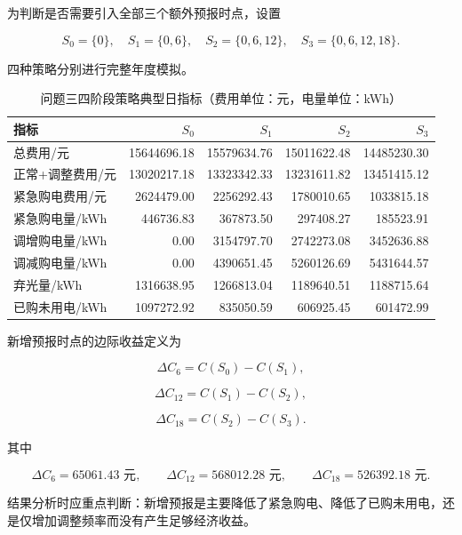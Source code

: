 为判断是否需要引入全部三个额外预报时点，设置

\[
S_0=\{0\},
\quad
S_1=\{0,6\},
\quad
S_2=\{0,6,12\},
\quad
S_3=\{0,6,12,18\}.
\]

四种策略分别进行完整年度模拟。

\begin{table}[H]
\centering
{}
\begin{tabular}{lrrrr}
\toprule
指标 & \(S_0\) & \(S_1\) & \(S_2\) & \(S_3\) \\
\midrule
总费用/元 & 15644696.18 & 15579634.76 & 15011622.48 & 14485230.30 \\
正常+调整费用/元 & 13020217.18 & 13323342.33 & 13231611.82 & 13451415.12 \\
紧急购电费用/元 & 2624479.00 & 2256292.43 & 1780010.65 & 1033815.18 \\
紧急购电量/kWh & 446736.83 & 367873.50 & 297408.27 & 185523.91 \\
调增购电量/kWh & 0.00 & 3154797.70 & 2742273.08 & 3452636.88 \\
调减购电量/kWh & 0.00 & 4390651.45 & 5260126.69 & 5431644.57 \\
弃光量/kWh & 1316638.95 & 1266813.04 & 1189640.51 & 1188715.64 \\
已购未用电/kWh & 1097272.92 & 835050.59 & 606925.45 & 601472.99 \\
\bottomrule
\end{tabular}
\caption{问题三四阶段策略典型日指标（费用单位：元，电量单位：kWh）}
\label{tab:8}
\end{table}

新增预报时点的边际收益定义为

\[
\Delta C_6=C(S_0)-C(S_1),
\]

\[
\Delta C_{12}=C(S_1)-C(S_2),
\]

\begin{equation}
\Delta C_{18}=C(S_2)-C(S_3).
\end{equation}

其中

\[
\Delta C_6=\text{65061.43 元},
\qquad
\Delta C_{12}=\text{568012.28 元},
\qquad
\Delta C_{18}=\text{526392.18 元}.
\]

结果分析时应重点判断：新增预报是主要降低了紧急购电、降低了已购未用电，还是仅增加调整频率而没有产生足够经济收益。



